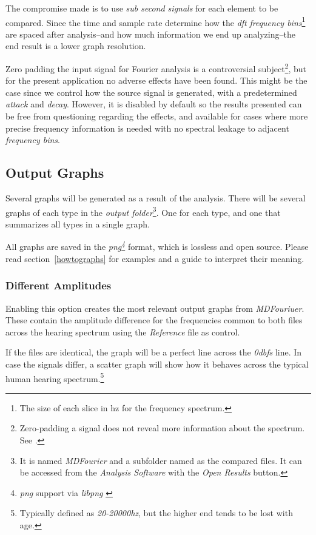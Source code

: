 \documentclass[10pt,a4paper]{report}
\newcommand{\defineCite}[2]{\textit{\acrshort{#1}\footnote{\textit{\acrlong{#1}} #2}}}
\newcommand{\ac}[1]{\textit{\mbox{\acrshort{#1}}}}
\newcommand{\hz}[1]{\textit{\mbox{#1\acrshort{hz}}}}
\newcommand{\db}[1]{\textit{\mbox{#1\acrshort{dbfs}}}}
\begin{document}
\begin{appendices}
The compromise made is to use \textit{sub second signals} for each element to be compared. Since the time and sample rate determine how the \ac{dft} \textit{frequency bins}\footnote{The size of each slice in \acrlong{hz} for the frequency spectrum.} are spaced after analysis--and how much information we end up analyzing--the end result is a lower graph resolution.

Zero padding the input signal for Fourier analysis is a controversial subject\footnote{Zero-padding a signal does not reveal more information about the spectrum. See \cite{zeropaddinginterpolate} \cite{ZeroPaddingBad}.}, but for the present application no adverse effects have been found. This might be the case since we control how the source signal is generated, with a predetermined \textit{attack} and \textit{decay}. However, it is disabled by default so the results presented can be free from questioning regarding the effects, and available for cases where more precise frequency information is needed with no spectral leakage to adjacent \textit{frequency bins}.

\subsection{Output Graphs}
\label{outputfiles}

Several graphs will be generated as a result of the analysis. There will be several graphs of each type in the \textit{output folder}\footnote{It is named \textit{MDFourier} and a subfolder named as the compared files. It can be accessed from the \textit{Analysis Software} with the \textit{Open Results} button.}. One for each type, and one that summarizes all types in a single graph.

All graphs are saved in the \defineCite{png}{support via \textit{libpng} \cite{libpng}} format, which is lossless and open source. Please read section~\ref{howtographs} for examples and a guide to interpret their meaning. 

\subsubsection{Different Amplitudes}

Enabling this option creates the most relevant output graphs from \textit{MDFouriuer}. These contain the amplitude difference for the frequencies common to both files across the hearing spectrum using the \textit{Reference} file as control.

If the files are identical, the graph will be a perfect line across the \db{0} line. In case the signals differ, a scatter graph will show how it behaves across the typical human hearing spectrum.\footnote{Typically defined as \hz{20-20000}, but the higher end tends to be lost with age.}


\end{appendices}
\end{document}
